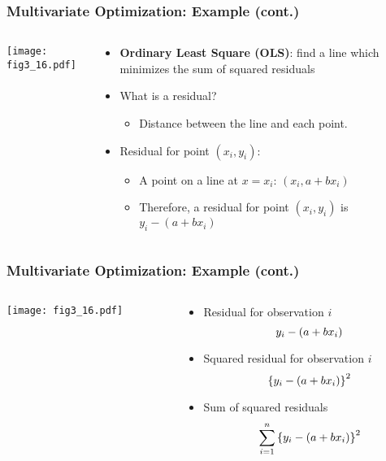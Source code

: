 \documentclass[pdflatex, 12pt]{beamer}
\begin{document}
\begin{frame}
\frametitle{Multivariate Optimization: Example (cont.)}
\begin{columns}
\begin{column}{0.5\textwidth}
\centering
\texttt{[image: fig3\_16.pdf]}
\end{column}
\begin{column}{0.5\textwidth}
\begin{itemize}
\item \textbf{Ordinary Least Square (OLS)}: find a line which minimizes the sum of squared residuals
\vspace{0.4cm}
\item What is a residual?
 \begin{itemize}
 \item Distance between the line and each point.
 \end{itemize}
\vspace{0.4cm}
\item Residual for point $(x_i, y_i)$:
 \begin{itemize}
 \item A point on a line at $x = x_i$: $(x_i, a + bx_i)$
 \item Therefore, a residual for point $(x_i, y_i)$ is $y_i - (a + bx_i)$
 \end{itemize}
\end{itemize}
\end{column}
\end{columns}
\end{frame}

\begin{frame}
\frametitle{Multivariate Optimization: Example (cont.)}
\begin{columns}
\begin{column}{0.5\textwidth}
\centering
\texttt{[image: fig3\_16.pdf]}
\end{column}
\begin{column}{0.5\textwidth}
\begin{itemize}
\item Residual for observation $i$
 \begin{equation}
 y_i - (a + bx_i) \notag
 \end{equation}
\item Squared residual for observation $i$
 \begin{equation}
 \left\{y_i - (a + bx_i)\right\}^2 \notag
 \end{equation}
\item Sum of squared residuals
 \begin{equation}
 \sum_{i = 1}^{n} \left\{y_i - (a + bx_i)\right\}^2 \notag
 \end{equation}
\end{itemize}
\end{column}
\end{columns}
\end{frame}
\end{document}
